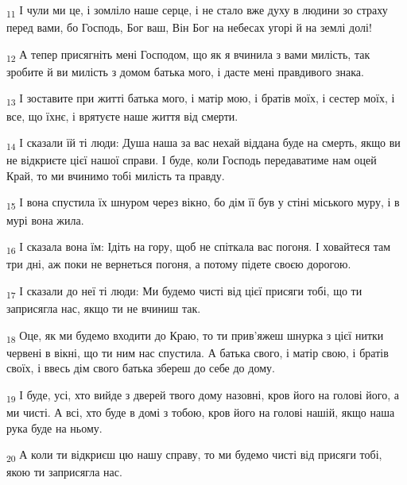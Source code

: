 \begin{tcolorbox}
\textsubscript{11} І чули ми це, і зомліло наше серце, і не стало вже духу в людини зо страху перед вами, бо Господь, Бог ваш, Він Бог на небесах угорі й на землі долі!
\end{tcolorbox}
\begin{tcolorbox}
\textsubscript{12} А тепер присягніть мені Господом, що як я вчинила з вами милість, так зробите й ви милість з домом батька мого, і дасте мені правдивого знака.
\end{tcolorbox}
\begin{tcolorbox}
\textsubscript{13} І зоставите при житті батька мого, і матір мою, і братів моїх, і сестер моїх, і все, що їхнє, і врятуєте наше життя від смерти.
\end{tcolorbox}
\begin{tcolorbox}
\textsubscript{14} І сказали їй ті люди: Душа наша за вас нехай віддана буде на смерть, якщо ви не відкриєте цієї нашої справи. І буде, коли Господь передаватиме нам оцей Край, то ми вчинимо тобі милість та правду.
\end{tcolorbox}
\begin{tcolorbox}
\textsubscript{15} І вона спустила їх шнуром через вікно, бо дім її був у стіні міського муру, і в мурі вона жила.
\end{tcolorbox}
\begin{tcolorbox}
\textsubscript{16} І сказала вона їм: Ідіть на гору, щоб не спіткала вас погоня. І ховайтеся там три дні, аж поки не вернеться погоня, а потому підете своєю дорогою.
\end{tcolorbox}
\begin{tcolorbox}
\textsubscript{17} І сказали до неї ті люди: Ми будемо чисті від цієї присяги тобі, що ти заприсягла нас, якщо ти не вчиниш так.
\end{tcolorbox}
\begin{tcolorbox}
\textsubscript{18} Оце, як ми будемо входити до Краю, то ти прив'яжеш шнурка з цієї нитки червені в вікні, що ти ним нас спустила. А батька свого, і матір свою, і братів своїх, і ввесь дім свого батька збереш до себе до дому.
\end{tcolorbox}
\begin{tcolorbox}
\textsubscript{19} І буде, усі, хто вийде з дверей твого дому назовні, кров його на голові його, а ми чисті. А всі, хто буде в домі з тобою, кров його на голові нашій, якщо наша рука буде на ньому.
\end{tcolorbox}
\begin{tcolorbox}
\textsubscript{20} А коли ти відкриєш цю нашу справу, то ми будемо чисті від присяги тобі, якою ти заприсягла нас.
\end{tcolorbox}
